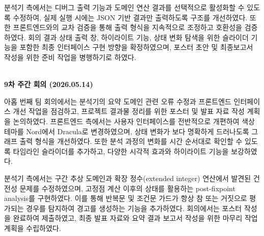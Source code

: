 \documentclass[a4paper,12pt]{article}
\begin{document}
분석기 측에서는 디버그 출력 기능과 도메인 연산 결과를 선택적으로 활성화할 수 있도록 수정하여, 실제 실행 시에는 JSON 기반 결과만 출력하도록 구조를 개선하였다. 또한 프론트엔드와의 교차 검증을 통해 출력 형식을 지속적으로 조정하고 호환성을 검증하였다. 회의 결과 상태 출력 창, 하이라이트 기능, 상태 변화 탐색을 위한 슬라이더 기능을 포함한 최종 인터페이스 구현 방향을 확정하였으며, 포스터 초안 및 최종보고서 작성을 위한 준비 작업을 병행하기로 하였다.

~\\

\textbf{\large 9차 주간 회의 (2026.05.14)}

아홉 번째 팀 회의에서는 분석기의 요약 도메인 관련 오류 수정과 프론트엔드 인터페이스 개선 작업을 점검하고, 프로젝트 결과물 정리를 위한 포스터 및 발표 자료 작성 계획을 논의하였다. 프론트엔드 측에서는 사용자 인터페이스를 전반적으로 개편하여 색상 테마를 Nord에서 Dracula로 변경하였으며, 상태 변화가 보다 명확하게 드러나도록 그래프 출력 형식을 개선하였다. 또한 분석 과정의 변화를 시간 순서대로 확인할 수 있도록 타임라인 슬라이더를 추가하고, 다양한 시각적 효과와 하이라이트 기능을 보강하였다.

분석기 측에서는 구간 추상 도메인과 확장 정수(extended integer) 연산에서 발견된 건전성 문제를 수정하였으며, 고정점 계산 이후의 상태를 활용하는 post-fixpoint analysis를 구현하였다. 이를 통해 반복문 및 조건문 가드가 항상 참 또는 거짓으로 평가되는 경우를 탐지하여 경고를 생성하는 기능을 추가하였다. 회의에서는 포스터 작성을 완료하여 제출하였고, 최종 발표 자료와 요약 결과 보고서 작성을 위한 마무리 작업 계획을 수립하였다.

\clearpage


\end{document}
